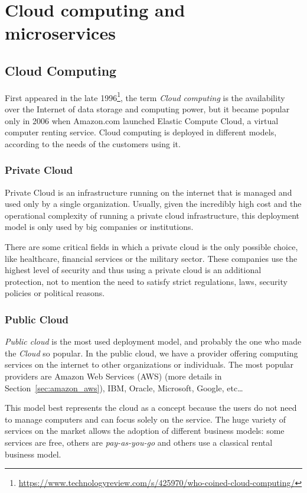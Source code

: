 \chapter{Cloud computing and microservices}
\section{Cloud Computing}
First appeared in the late 1996\footnote{\url{https://www.technologyreview.com/s/425970/who-coined-cloud-computing/}},
the term \textit{Cloud computing} is the availability over the Internet of data storage
and computing power, but it became popular only in 2006 when Amazon.com 
launched  Elastic Compute Cloud, a virtual computer renting service.
Cloud computing is deployed in different models, according to the needs of the customers
using it.
\subsection{Private Cloud}
Private Cloud is an infrastructure running on the internet 
that is managed and used only by a single organization.
Usually, given the incredibly high cost and the operational complexity of running  a private cloud infrastructure,
this deployment model is only used by big companies or institutions.

There are some critical fields in which a private cloud is the only
possible choice, like healthcare, financial services or the military sector.
These companies use the highest level of security and thus using a private cloud is an additional protection, 
not to mention the need to satisfy strict regulations, laws, security policies or political reasons.

\subsection{Public Cloud}
\textit{Public cloud} is the most used deployment model, and probably
the one who made the \textit{Cloud} so popular.  In the public cloud,
we have a provider offering computing services on the internet to
other organizations or individuals. The most popular providers are
Amazon Web Services (AWS) (more details in
Section~\ref{sec:amazon_aws}), IBM, Oracle, Microsoft, Google,
etc\dots

This model best represents the cloud as a concept because the users
do not need to manage computers and can focus solely on the service.
The huge variety of services on the market allows the adoption of
different business models: some services are free, others are
\textit{pay-as-you-go} and others use a classical rental business
model.

